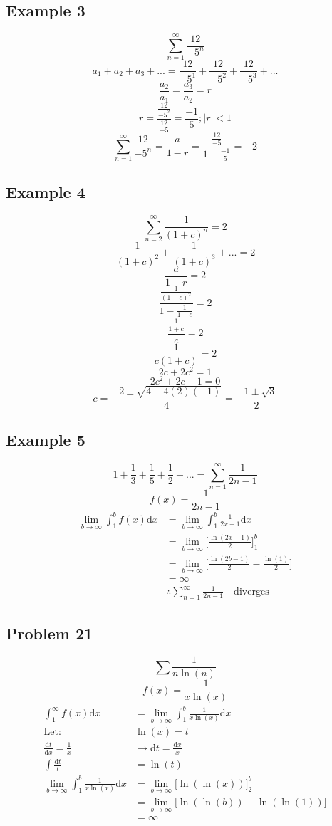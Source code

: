 \documentclass[letterpaper, 12pt]{article}
\newcommand*{\diff}{\mathrm{d}}
\newcommand*{\ddiff}[2]{\frac{\diff{#1}}{\diff{#2}}}
\begin{document}
\subsection*{Example 3}
\[ \sum_{n=1}^{\infty}\frac{12}{-5^{n}} \]
\[ a_{1}+a_{2}+a_{3}+... =
   \frac{12}{-5^{1}}+\frac{12}{-5^{2}}+\frac{12}{-5^{3}}+... \]
\[ \frac{a_{2}}{a_{1}} = \frac{a_{3}}{a_{2}} = r \]
\[ r = \frac{\frac{12}{-5^{2}}}{\frac{12}{-5}} = \frac{-1}{5}; |r| < 1 \]
\[ \sum_{n=1}^{\infty}\frac{12}{-5^{n}} = \frac{a}{1-r} =
   \frac{\frac{12}{-5}}{1-\frac{-1}{5}} = -2 \]

\subsection*{Example 4}
\[ \sum_{n=2}^{\infty}\frac{1}{(1+c)^{n}} = 2 \]
\[ \frac{1}{(1+c)^{2}}+\frac{1}{(1+c)^{3}}+... = 2 \]
\[ \frac{a}{1-r} = 2 \]
\[ \frac{\frac{1}{(1+c)^{2}}}{1-\frac{1}{1+c}} = 2 \]
\[ \frac{\frac{1}{1+c}}{c} = 2 \]
\[ \frac{1}{c(1+c)} = 2 \]
\[ 2c+2c^{2} = 1 \]
\[ 2c^{2}+2c-1 = 0 \]
\[ c = \frac{-2\pm\sqrt{4-4(2)(-1)}}{4} = \frac{-1\pm\sqrt{3}}{2} \]

\subsection*{Example 5}
\[ 1+\frac{1}{3}+\frac{1}{5}+\frac{1}{2}+... =
   \sum_{n=1}^{\infty}\frac{1}{2n-1} \]
\[ f(x) = \frac{1}{2n-1} \]
\begin{align*}
  \lim_{b\to\infty}\int_{1}^{b}f(x)\diff{x} &=
    \lim_{b\to\infty}\int_{1}^{b}\frac{1}{2x-1}\diff{x} \\
  &= \lim_{b\to\infty}\bigg[\frac{\ln(2x-1)}{2}\bigg]_{1}^{b} \\
  &= \lim_{b\to\infty}\bigg[\frac{\ln(2b-1)}{2}-\frac{\ln(1)}{2}\bigg] \\
  &= \infty \\
  & \therefore \sum_{n=1}^{\infty}\frac{1}{2n-1} \quad \mathrm{diverges}
\end{align*}

\subsection*{Problem 21}
\[ \sum\frac{1}{n\ln(n)} \]
\[ f(x) = \frac{1}{x\ln(x)} \]
\begin{align*}
  \int_{1}^{\infty}f(x)\diff{x} &=
    \lim_{b\to\infty}\int_{1}^{b}\frac{1}{x\ln(x)}\diff{x} \\
  \mathrm{Let:} & \ln(x) = t \\
  \ddiff{t}{x} = \frac{1}{x} & \rightarrow \diff{t} = \frac{\diff{x}}{x} \\
  \int\frac{\diff{t}}{t} &= \ln(t) \\
  \lim_{b\to\infty}\int_{1}^{b}\frac{1}{x\ln(x)}\diff{x} &=
    \lim_{b\to\infty}\bigg[\ln(\ln(x))\bigg]_{2}^{b} \\
  &= \lim_{b\to\infty}\bigg[\ln(\ln(b))-\ln(\ln(1))\bigg] \\
  &= \infty
\end{align*}
\end{document}
